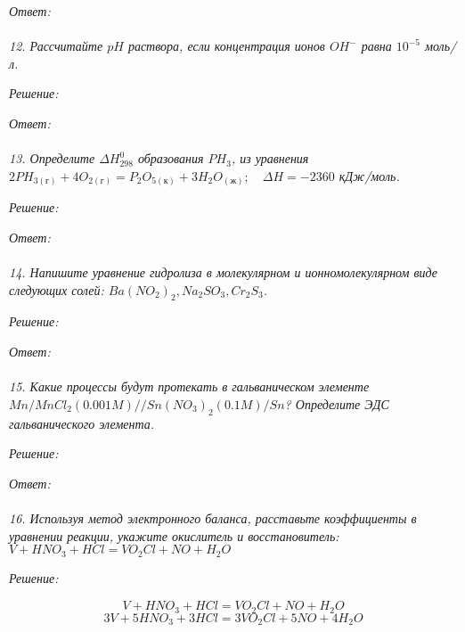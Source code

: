 \emph{Ответ: } \\\\


\emph{12. Рассчитайте \( pH \) раствора, если концентрация ионов 
\( OH^{-} \) равна \( 10^{-5} \) моль/л.}

\emph{Решение:}

\emph{Ответ: } \\\\


\emph{13. Определите \( \Delta H^{0}_{298} \) образования \( PH_3\), 
из уравнения 
\(
    2PH_{3(\text{г})} + 4O_{2(\text{г})} = 
    P_2 O_{5(\text{к})} + 3H_2 O_{(\text{ж})};\quad
    \Delta H = -2360 
\) кДж/моль.}

\emph{Решение:}

\emph{Ответ: } \\\\


\emph{14. Напишите уравнение гидролиза в молекулярном и 
ионномолекулярном виде следующих солей: 
\( Ba(NO_2)_2, Na_2 SO_3, Cr_2 S_3 \).}

\emph{Решение:}

\emph{Ответ: } \\\\


\emph{15. Какие процессы будут протекать в гальваническом элементе 
\( Mn/MnCl_2(0.001 M)//Sn(NO_3)_2(0.1 M)/Sn \)? 
Определите ЭДС гальванического элемента.}

\emph{Решение:}

\emph{Ответ: } \\\\


\emph{16. Используя метод электронного баланса, расставьте коэффициенты 
в уравнении реакции, укажите окислитель и восстановитель:
\( V + HNO_3 + HCl = VO_2 Cl + NO + H_2 O \) }

\emph{Решение:}

\[ 
	\stackrel{}{V} + \stackrel{}{H}\stackrel{}{N}\stackrel{}{O}_3 + 
	\stackrel{}{H}\stackrel{}{Cl} = \stackrel{}{V}\stackrel{}{O}_2
	\stackrel{}{Cl} + 
	\stackrel{}{N}\stackrel{}{O} + \stackrel{}{H}_2\stackrel{}{O} 
\]
\[ 3V + 5HNO_3 + 3HCl = 3VO_2 Cl + 5NO + 4H_2 O \]

